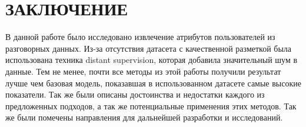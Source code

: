 \chapter{\centering\normalsize{ЗАКЛЮЧЕНИЕ}}

В данной работе было исследовано извлечение атрибутов пользователей из разговорных данных. Из-за отсутствия датасета с качественной разметкой была использована техника distant supervision, которая добавила значительный шум в данные. Тем не менее, почти все методы из этой работы получили результат лучше чем базовая модель, показавшая в использованном датасете самые высокие показатели. Так же были описаны достоинства и недостатки каждого из предложенных подходов, а так же потенциальные применения этих методов. Так же были помечены направления для дальнейшей разработки и исследований.
